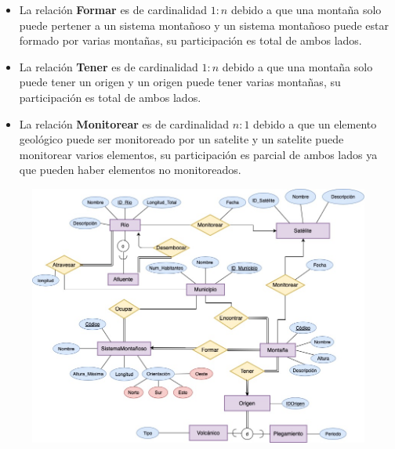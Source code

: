 \documentclass[letterpaper,11pt]{article}
\begin{document}
\begin{itemize}
\begin{itemize}
\begin{itemize}
      \item La relación \textbf{Formar} es de cardinalidad $1:n$ debido a que una montaña
            solo puede pertener a un sistema montañoso y un sistema montañoso puede estar
            formado por varias montañas, su participación es total de ambos lados.

      \item La relación \textbf{Tener} es de cardinalidad $1:n$ debido a que una montaña
            solo puede tener un origen y un origen puede tener varias montañas, su
            participación es total de ambos lados.

      \item La relación \textbf{Monitorear} es de cardinalidad $n:1$ debido a que un
            elemento geológico puede ser monitoreado por un satelite y un satelite puede
            monitorear varios elementos, su participación es parcial de ambos lados ya que
            pueden haber elementos no monitoreados.
      \end{itemize}



    \end{itemize}

 \begin{figure}[h]
  \centering
  \includegraphics[scale=0.5]{./imagenes/Ejercicio2b.jpeg}
  \end{figure}

\end{itemize}
\end{document}
